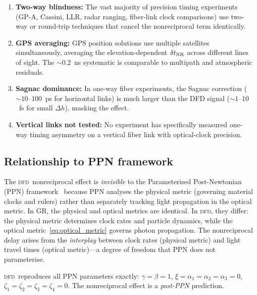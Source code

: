\documentclass[aps,prl,twocolumn,superscriptaddress,showpacs]{revtex4-2}
\newcommand{\DFD}{\textsc{dfd}}
\begin{document}
\begin{enumerate}
\item \textbf{Two-way blindness:} The vast majority of precision
      timing experiments (GP-A, Cassini, LLR, radar ranging,
      fiber-link clock comparisons) use two-way or round-trip
      techniques that cancel the nonreciprocal term identically.

\item \textbf{GPS averaging:} GPS position solutions use multiple
      satellites simultaneously, averaging the elevation-dependent
      $\delta t_{\rm NR}$ across different lines of sight.  The
      $\sim 0.2$~ns systematic is comparable to multipath and
      atmospheric residuals.

\item \textbf{Sagnac dominance:} In one-way fiber experiments,
      the Sagnac correction ($\sim 10$--$100$~ps for horizontal
      links) is much larger than the DFD signal ($\sim 1$--$10$~fs
      for small $\Delta h$), masking the effect.

\item \textbf{Vertical links not tested:} No experiment has
      specifically measured one-way timing asymmetry on a vertical
      fiber link with optical-clock precision.
\end{enumerate}

\subsection{Relationship to PPN framework}

The \DFD\ nonreciprocal effect is \emph{invisible} to the
Parameterised Post-Newtonian (PPN) framework~\cite{Will2018}
because PPN analyses the physical metric (governing material
clocks and rulers) rather than separately tracking light
propagation in the optical metric.  In GR, the physical and
optical metrics are identical.  In \DFD, they differ: the
physical metric determines clock rates and particle dynamics,
while the optical metric~\eqref{eq:optical_metric} governs
photon propagation.  The nonreciprocal delay arises from the
\emph{interplay} between clock rates (physical metric) and
light travel times (optical metric)---a degree of freedom that
PPN does not parameterise.

\DFD\ reproduces all PPN parameters exactly:
$\gamma = \beta = 1$, $\xi = \alpha_1 = \alpha_2 = \alpha_3 = 0$,
$\zeta_1 = \zeta_2 = \zeta_3 = \zeta_4 = 0$.  The nonreciprocal
effect is a \emph{post-PPN} prediction.
\end{document}
